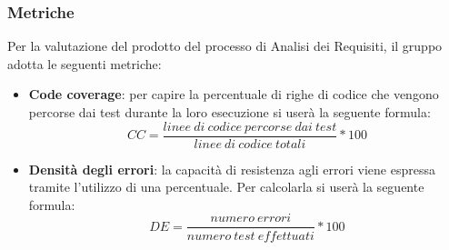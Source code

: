 \subsubsection{Metriche}
Per la valutazione del prodotto del processo di Analisi dei Requisiti, il gruppo adotta le seguenti metriche:
\begin{itemize}
	\item \textbf{Code coverage}: per capire la percentuale di righe di codice che vengono percorse dai test durante la loro esecuzione si userà la seguente formula:
\[CC=\frac{linee \ di \ codice \ percorse \ dai \ test}{linee \ di \ codice \ totali}*100\]
	\item \textbf{Densità degli errori}: la capacità di resistenza agli errori viene espressa tramite l'utilizzo di una percentuale. Per calcolarla si userà la seguente formula:
\[DE=\frac{numero \ errori}{numero \ test \ effettuati}*100\]
\end{itemize}
 